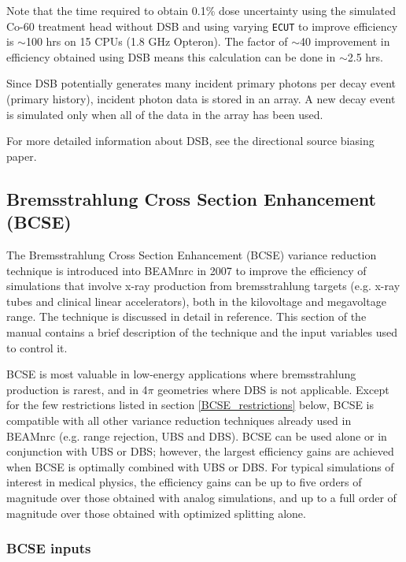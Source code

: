\documentclass[12pt,twoside]{article}
\begin{document}
Note that the time required to obtain 0.1\% dose uncertainty using the simulated Co-60 treatment
head\cite{Mo99} without DSB and using varying {\tt ECUT} to improve efficiency is $\sim$100 hrs on 15 CPUs (1.8 GHz Opteron).  The factor of $\sim$40 improvement in efficiency obtained using DSB means this calculation can be done in
$\sim$2.5 hrs.

Since DSB potentially generates many incident primary photons per decay event (primary history), incident photon data is
stored in an array. A new decay event is simulated only when all of the data in the array has been used.

For more detailed information about DSB, see the directional source biasing paper\cite{Wa15}.

\subsection[BCSE]{Bremsstrahlung Cross Section Enhancement (BCSE)}
\label{BCSE}

The Bremsstrahlung Cross Section Enhancement (BCSE) variance reduction
technique is introduced into BEAMnrc in 2007 to improve
the efficiency of simulations that involve x-ray production from
bremsstrahlung targets (e.g. x-ray tubes and clinical linear
accelerators), both in the kilovoltage and megavoltage range. The
technique is discussed in detail in reference\cite{AR07}. This
section of the manual contains a brief description of the technique
and the input variables used to control it.

BCSE is most valuable in low-energy applications where bremsstrahlung
production is rarest, and in 4$\pi$ geometries where DBS is not
applicable. Except for the few restrictions listed in section
\ref{BCSE_restrictions} below, BCSE is compatible with all other
variance reduction techniques already used in BEAMnrc (e.g. range
rejection, UBS and DBS). BCSE can be used alone or in conjunction with
UBS or DBS; however, the largest efficiency gains are achieved when
BCSE is optimally combined with UBS or DBS. For typical simulations of
interest in medical physics, the efficiency gains can be up to five
orders of magnitude over those obtained with analog simulations, and
up to a full order of magnitude over those obtained with optimized
splitting alone.

\subsubsection{BCSE inputs}
\end{document}
